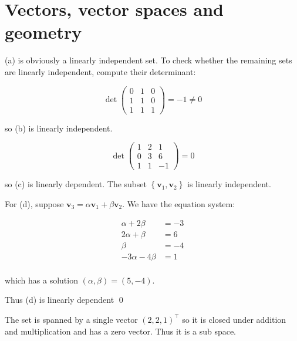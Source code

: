 \documentclass[12pt]{article}
\begin{document}



\pagebreak
\section*{Vectors, vector spaces and geometry}


(a) is obviously a linearly independent set. To check whether the remaining sets are linearly independent, compute their determinant:

\begin{equation}
    \det{\begin{pmatrix}
            0 & 1 & 0 \\
            1 & 1 & 0 \\
            1 & 1 & 1
        \end{pmatrix}} = -1 \ne 0
\end{equation}

so (b) is linearly independent.

\begin{equation}
    \det{\begin{pmatrix}
            1 & 2 & 1  \\
            0 & 3 & 6  \\
            1 & 1 & -1
        \end{pmatrix}} = 0
\end{equation}

so (c) is linearly dependent. The subset $\left\{ \mathbf{v}_{1}, \mathbf{v}_{2} \right\}$ is linearly independent.

For (d), suppose $\mathbf{v}_{3} = \alpha \mathbf{v}_{1} + \beta \mathbf{v}_{2}$. We have the equation system:

\begin{equation}
    \begin{split}
        \alpha + 2\beta &= -3 \\
        2\alpha + \beta &= 6 \\
        \beta &= -4 \\
        -3\alpha - 4\beta &= 1 \\
    \end{split}
\end{equation}

which has a solution $(\alpha, \beta) = (5, -4)$.

Thus (d) is linearly dependent
\qed



The set is spanned by a single vector $(2, 2, 1)^{\intercal}$ so it is closed under addition and multiplication and has a zero vector. Thus it is a sub space.
\end{document}
